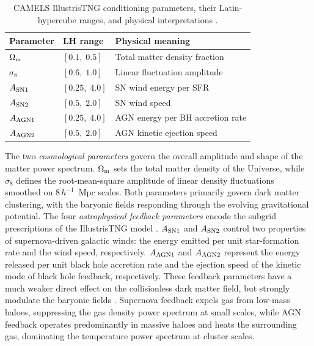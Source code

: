 \documentclass[usenatbib]{mnras}
\newcommand{\Om}{\Omega_{\rm m}}
\newcommand{\sig}{\sigma_8}
\begin{document}
\begin{table}
  \centering
  \small
  \setlength{\tabcolsep}{4pt}
  \renewcommand{\arraystretch}{1.08}
  \begin{tabular*}{\columnwidth}{@{\extracolsep{\fill}}lll@{}}
    \toprule
    Parameter & LH range & Physical meaning \\
    \midrule
    $\Om$          & $[0.1,\;0.5]$  & Total matter density fraction \\
    $\sig$         & $[0.6,\;1.0]$  & Linear fluctuation amplitude \\
    $A_{\rm SN1}$  & $[0.25,\;4.0]$ & SN wind energy per SFR \\
    $A_{\rm SN2}$  & $[0.5,\;2.0]$  & SN wind speed \\
    $A_{\rm AGN1}$ & $[0.25,\;4.0]$ & AGN energy per BH accretion rate \\
    $A_{\rm AGN2}$ & $[0.5,\;2.0]$  & AGN kinetic ejection speed \\
    \bottomrule
  \end{tabular*}
  \caption{CAMELS IllustrisTNG conditioning parameters, their
    Latin-hypercube ranges, and physical interpretations
    \citep{Villaescusa2021,Villaescusa2022}.}
  \label{tab:params}
\end{table}

The two \emph{cosmological parameters} govern the overall amplitude
and shape of the matter power spectrum.
$\Om$ sets the total matter density of the Universe, while
$\sig$ defines the root-mean-square amplitude of linear density
fluctuations smoothed on $8\,h^{-1}$~Mpc scales.
Both parameters primarily govern dark matter clustering, with the
baryonic fields responding through the evolving gravitational
potential.
The four \emph{astrophysical feedback parameters} encode the
subgrid prescriptions of the IllustrisTNG model
\citep{Weinberger2017,Pillepich2018IllustrisTNG}.
$A_{\rm SN1}$ and $A_{\rm SN2}$ control two properties of
supernova-driven galactic winds: the energy emitted per unit
star-formation rate and the wind speed, respectively.
$A_{\rm AGN1}$ and $A_{\rm AGN2}$ represent the energy released per
unit black hole accretion rate and the ejection speed of the kinetic
mode of black hole feedback, respectively.
These feedback parameters have a much weaker direct effect on the
collisionless dark matter field, but strongly modulate the
baryonic fields \citep{Villaescusa2021}. Supernova feedback expels gas
from low-mass haloes, suppressing the gas density power spectrum at
small scales, while AGN feedback operates predominantly in massive
haloes and heats the surrounding gas, dominating the temperature power
spectrum at cluster scales.
\end{document}
